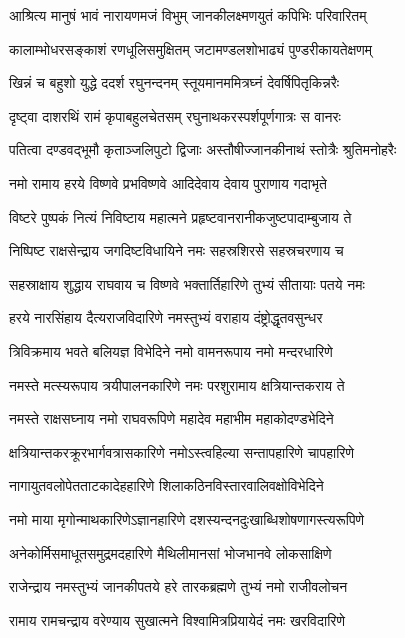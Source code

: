 \twolineshloka
{आश्रित्य मानुषं भावं नारायणमजं विभुम्}
{जानकीलक्ष्मणयुतं कपिभिः परिवारितम्}%

\twolineshloka
{कालाम्भोधरसङ्काशं रणधूलिसमुक्षितम्}
{जटामण्डलशोभाढ्यं पुण्डरीकायतेक्षणम्}%

\twolineshloka
{खिन्नं च बहुशो युद्धे ददर्श रघुनन्दनम्}
{स्तूयमानममित्रघ्नं देवर्षिपितृकिन्नरैः}%

\twolineshloka
{दृष्ट्वा दाशरथिं रामं कृपाबहुलचेतसम्}
{रघुनाथकरस्पर्शपूर्णगात्रः स वानरः}%

\twolineshloka
{पतित्वा दण्डवद्भूमौ कृताञ्जलिपुटो द्विजाः}
{अस्तौषीज्जानकीनाथं स्तोत्रैः श्रुतिमनोहरैः}%


\twolineshloka
{नमो रामाय हरये विष्णवे प्रभविष्णवे}
{आदिदेवाय देवाय पुराणाय गदाभृते}%

\twolineshloka
{विष्टरे पुष्पकं नित्यं निविष्टाय महात्मने}
{प्रहृष्टवानरानीकजुष्टपादाम्बुजाय ते}%

\twolineshloka
{निष्पिष्ट राक्षसेन्द्राय जगदिष्टविधायिने}
{नमः सहस्रशिरसे सहस्रचरणाय च}%

\twolineshloka
{सहस्राक्षाय शुद्धाय राघवाय च विष्णवे}
{भक्तार्तिहारिणे तुभ्यं सीतायाः पतये नमः}%

\twolineshloka
{हरये नारसिंहाय दैत्यराजविदारिणे}
{नमस्तुभ्यं वराहाय दंष्ट्रोद्धृतवसुन्धर}%

\twolineshloka
{त्रिविक्रमाय भवते बलियज्ञ विभेदिने}
{नमो वामनरूपाय नमो मन्दरधारिणे}%

\twolineshloka
{नमस्ते मत्स्यरूपाय त्रयीपालनकारिणे}
{नमः परशुरामाय क्षत्रियान्तकराय ते}%

\twolineshloka
{नमस्ते राक्षसघ्नाय नमो राघवरूपिणे}
{महादेव महाभीम महाकोदण्डभेदिने}%

\twolineshloka
{क्षत्रियान्तकरक्रूरभार्गवत्रासकारिणे}
{नमोऽस्त्वहिल्या सन्तापहारिणे चापहारिणे}%

\twolineshloka
{नागायुतवलोपेतताटकादेहहारिणे}
{शिलाकठिनविस्तारवालिवक्षोविभेदिने}%

\twolineshloka
{नमो माया मृगोन्माथकारिणेऽज्ञानहारिणे}
{दशस्यन्दनदुःखाब्धिशोषणागस्त्यरूपिणे}%

\twolineshloka
{अनेकोर्मिसमाधूतसमुद्रमदहारिणे}
{मैथिलीमानसां भोजभानवे लोकसाक्षिणे}%

\twolineshloka
{राजेन्द्राय नमस्तुभ्यं जानकीपतये हरे}
{तारकब्रह्मणे तुभ्यं नमो राजीवलोचन}%

\twolineshloka
{रामाय रामचन्द्राय वरेण्याय सुखात्मने}
{विश्वामित्रप्रियायेदं नमः खरविदारिणे}%

